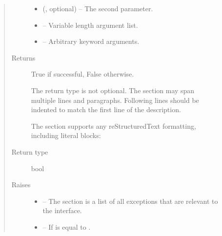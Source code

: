 \documentclass[letterpaper,10pt,english]{sphinxmanual}
\begin{document}
\begin{description}
\begin{fulllineitems}
\begin{quote}
\begin{description}
\begin{itemize}
\item {} 
 (, optional) – The second parameter.

\item {} 
 – Variable length argument list.

\item {} 
 – Arbitrary keyword arguments.

\end{itemize}

\item[{Returns}] \leavevmode

True if successful, False otherwise.

The return type is not optional. The  section may span
multiple lines and paragraphs. Following lines should be indented to
match the first line of the description.

The  section supports any reStructuredText formatting,
including literal blocks:

\begin{sphinxVerbatim}[commandchars=\\\{\}]
     
     
\end{sphinxVerbatim}


\item[{Return type}] \leavevmode
bool

\item[{Raises}] \leavevmode\begin{itemize}
\item {} 
 – The  section is a list of all exceptions
    that are relevant to the interface.

\item {} 
 – If  is equal to .

\end{itemize}

\end{description}\end{quote}


\end{fulllineitems}
\end{description}
\end{document}
